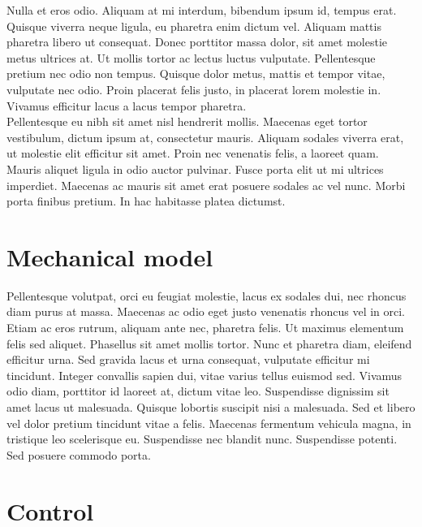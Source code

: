 \documentclass[a4paper, 11pt] {article}
\begin{document}
 Nulla et eros odio. Aliquam at mi interdum, bibendum ipsum id, tempus erat. Quisque viverra neque ligula, eu pharetra enim dictum vel. Aliquam mattis pharetra libero ut consequat. Donec porttitor massa dolor, sit amet molestie metus ultrices at. Ut mollis tortor ac lectus luctus vulputate. Pellentesque pretium nec odio non tempus. Quisque dolor metus, mattis et tempor vitae, vulputate nec odio. Proin placerat felis justo, in placerat lorem molestie in. Vivamus efficitur lacus a lacus tempor pharetra.
\\
Pellentesque eu nibh sit amet nisl hendrerit mollis. Maecenas eget tortor vestibulum, dictum ipsum at, consectetur mauris. Aliquam sodales viverra erat, ut molestie elit efficitur sit amet. Proin nec venenatis felis, a laoreet quam. Mauris aliquet ligula in odio auctor pulvinar. Fusce porta elit ut mi ultrices imperdiet. Maecenas ac mauris sit amet erat posuere sodales ac vel nunc. Morbi porta finibus pretium. In hac habitasse platea dictumst. 


\section{Mechanical model}

Pellentesque volutpat, orci eu feugiat molestie, lacus ex sodales dui, nec rhoncus diam purus at massa. Maecenas ac odio eget justo venenatis rhoncus vel in orci. Etiam ac eros rutrum, aliquam ante nec, pharetra felis. Ut maximus elementum felis sed aliquet. Phasellus sit amet mollis tortor. Nunc et pharetra diam, eleifend efficitur urna. Sed gravida lacus et urna consequat, vulputate efficitur mi tincidunt. Integer convallis sapien dui, vitae varius tellus euismod sed. Vivamus odio diam, porttitor id laoreet at, dictum vitae leo. Suspendisse dignissim sit amet lacus ut malesuada. Quisque lobortis suscipit nisi a malesuada. Sed et libero vel dolor pretium tincidunt vitae a felis. Maecenas fermentum vehicula magna, in tristique leo scelerisque eu. Suspendisse nec blandit nunc. Suspendisse potenti. Sed posuere commodo porta. 




\section{Control}
\end{document}
